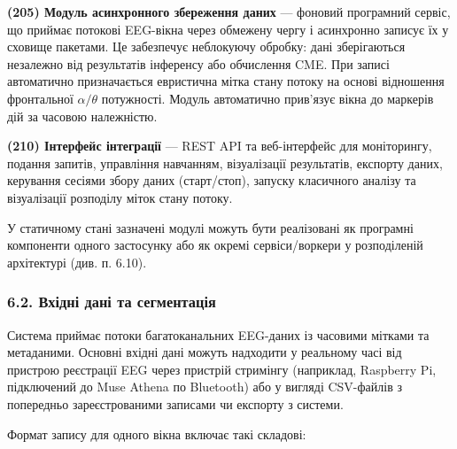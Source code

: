 \documentclass[12pt,a4paper]{article}
\begin{document}
\textbf{(205) Модуль асинхронного збереження даних} --- фоновий програмний сервіс, що приймає потокові EEG-вікна через обмежену чергу і асинхронно записує їх у сховище пакетами. Це забезпечує неблокуючу обробку: дані зберігаються незалежно від результатів інференсу або обчислення CME. При записі автоматично призначається евристична мітка стану потоку на основі відношення фронтальної \(\alpha/\theta\) потужності. Модуль автоматично прив'язує вікна до маркерів дій за часовою належністю.



\textbf{(210) Інтерфейс інтеграції} --- REST API та веб-інтерфейс для моніторингу, подання запитів, управління навчанням, візуалізації результатів, експорту даних, керування сесіями збору даних (старт/стоп), запуску класичного аналізу та візуалізації розподілу міток стану потоку.



У статичному стані зазначені модулі можуть бути реалізовані як програмні компоненти одного застосунку або як окремі сервіси/воркери у розподіленій архітектурі (див. п. 6.10).



\subsubsection{6.2. Вхідні дані та сегментація}\label{ux432ux445ux456ux434ux43dux456-ux434ux430ux43dux456-ux442ux430-ux441ux435ux433ux43cux435ux43dux442ux430ux446ux456ux44f}



Система приймає потоки багатоканальних EEG-даних із часовими мітками та метаданими. Основні вхідні дані можуть надходити у реальному часі від пристрою реєстрації EEG через пристрій стримінгу (наприклад, Raspberry Pi, підключений до Muse Athena по Bluetooth) або у вигляді CSV-файлів з попередньо зареєстрованими записами чи експорту з системи.



Формат запису для одного вікна включає такі складові:
\end{document}
